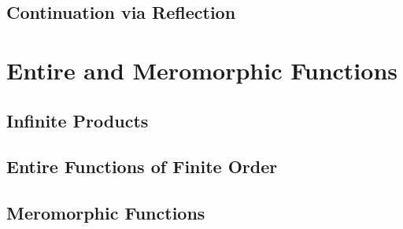 \documentclass[oneside]{memoir}
\begin{document}



\section{Continuation via Reflection}
\label{sec:continuation_via_reflection}



\chapter{Entire and Meromorphic Functions}
\label{cha:entire_and_meromorphic_functions}

\section{Infinite Products}
\label{sec:infinite_products}





\section{Entire Functions of Finite Order}
\label{sub:entire_functions_of_finite_order}



\section{Meromorphic Functions}
\label{sec:meromorphic_functions}







\end{document}
